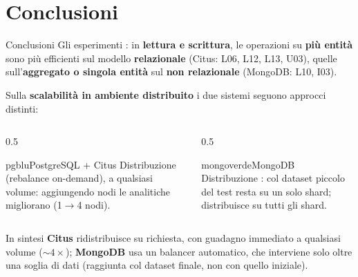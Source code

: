 \documentclass[aspectratio=169,11pt]{beamer}
\begin{document}
\section{Conclusioni}
\begin{frame}{Conclusioni}
  Gli esperimenti : in \textbf{lettura e scrittura}, le operazioni su
  \textcolor{pgblu}{\textbf{più entità}} sono più efficienti sul modello \textbf{relazionale} (Citus: L06, L12,
  L13, U03), quelle sull'\textcolor{mongoverde}{\textbf{aggregato o singola entità}} sul \textbf{non relazionale}
  (MongoDB: L10, I03).
  \par\smallskip Sulla \textbf{scalabilità in ambiente distribuito} i due sistemi seguono approcci distinti:
  \par\smallskip
  \begin{columns}[T]
    \begin{column}{0.5\textwidth}
      \begin{sysblock}{pgblu}{PostgreSQL + Citus}
        \footnotesize Distribuzione  (rebalance on-demand), a qualsiasi volume: aggiungendo
        nodi le analitiche migliorano  (1$\to$4 nodi).
      \end{sysblock}
    \end{column}
    \begin{column}{0.5\textwidth}
      \begin{sysblock}{mongoverde}{MongoDB}
        \footnotesize Distribuzione : col dataset piccolo del test resta su
        un solo shard;  distribuisce su tutti gli shard.
      \end{sysblock}
    \end{column}
  \end{columns}
  \smallskip
  \begin{keyblock}{In sintesi}
    \footnotesize \textcolor{pgblu}{\textbf{Citus}} ridistribuisce su richiesta, con guadagno immediato a
    qualsiasi volume (${\sim}4\times$); \textcolor{mongoverde}{\textbf{MongoDB}} usa un balancer automatico, che
    interviene solo oltre una soglia di dati (raggiunta col dataset finale, non con quello iniziale).
  \end{keyblock}
\end{frame}
\end{document}
